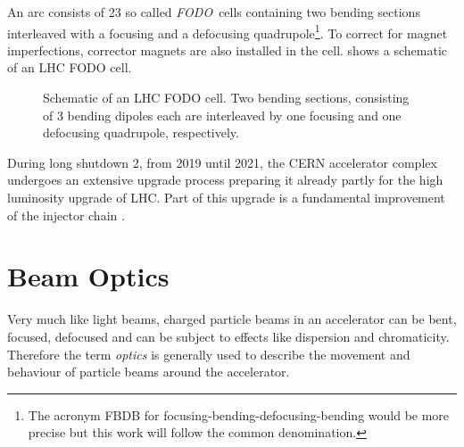 An arc consists of 23 so called \emph{FODO}~cells containing two bending sections interleaved with
a focusing and a defocusing quadrupole\footnote{
    The acronym FBDB for focusing-bending-defocusing-bending would be more precise but this work will follow
    the common denomination.
}.
To correct for magnet imperfections, corrector magnets are also installed in the cell.
 shows a schematic of an LHC FODO cell.
%
\begin{figure}[h]
    \centering
     
    \caption{
        Schematic of an LHC FODO cell. Two bending sections, consisting of 3 bending dipoles each
        are interleaved by one focusing and one defocusing quadrupole, respectively.
    }
    \label{fig_fodo}
\end{figure}
%
During long shutdown 2, from 2019 until 2021, the CERN accelerator complex undergoes an extensive upgrade process 
preparing it already partly for the high luminosity upgrade of LHC. Part of this upgrade is a
fundamental improvement of the injector chain \cite{Hanke2017,Bartosik2017}.




\section{Beam Optics}

Very much like light beams, charged particle beams in an accelerator can be bent, focused, defocused
and can be subject to effects like dispersion and chromaticity. Therefore the term \emph{optics} is
generally used to describe the movement and behaviour of particle beams around the accelerator.

